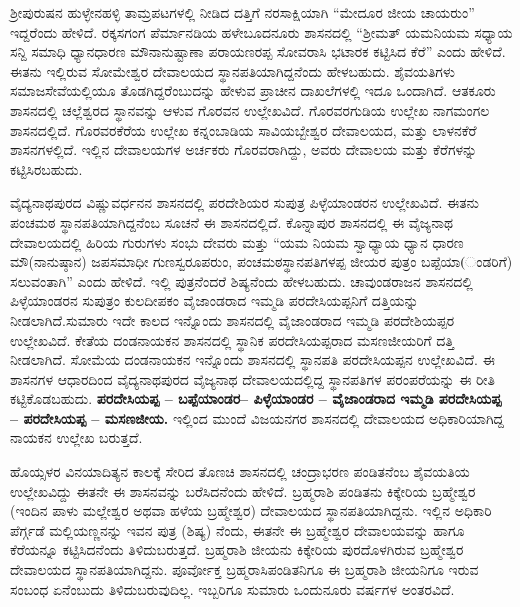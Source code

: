 ಶ‍್ರೀಪುರುಷನ ಹುಳ್ಳೇನಹಳ್ಳಿ ತಾಮ್ರಪಟಗಳಲ್ಲಿ ನೀಡಿದ ದತ್ತಿಗೆ ನರಸಾಕ್ಷಿಯಾಗಿ “ಮೇದೂರ ಜೀಯ ಚಾಯರುಂ” ಇದ್ದರೆಂದು ಹೇಳಿದೆ. ರಕ್ಕಸಗಂಗ ಪೆರ್ಮಾನಡಿಯ ಹಳೇಬೂದನೂರು ಶಾಸನದಲ್ಲಿ “ಶ‍್ರೀಮತ್​ ಯಮನಿಯಮ ಸಧ್ಯಾಯ ಸನ್ದಿ ಸಮಾಧಿ ಧ್ಯಾನಧಾರಣ ಮೌನಾನುಷ್ಟಾಣಾ ಪರಾಯಣರಪ್ಪ ಸೋವರಾಸಿ ಭಟಾರಕ ಕಟ್ಟಿಸಿದ ಕೆರೆ” ಎಂದು ಹೇಳಿದೆ. ಈತನು ಇಲ್ಲಿರುವ ಸೋಮೇಶ್ವರ ದೇವಾಲಯದ ಸ್ಥಾನಪತಿಯಾಗಿದ್ದನೆಂದು ಹೇಳಬಹುದು. ಶೈವಯತಿಗಳು ಸಮಾಜಸೇವೆಯಲ್ಲಿಯೂ ತೊಡಗಿದ್ದರೆಂಬುದನ್ನು ಹೇಳುವ ಪ್ರಾಚೀನ ದಾಖಲೆಗಳಲ್ಲಿ ಇದೂ ಒಂದಾಗಿದೆ. ಆತಕೂರು ಶಾಸನದಲ್ಲಿ ಚಲ್ಲೆಶ್ವರದ ಸ್ಥಾನವನ್ನು ಆಳುವ ಗೊರವನ ಉಲ್ಲೇಖವಿದೆ. ಗೊರವರಗುಡಿಯ ಉಲ್ಲೇಖ ನಾಗಮಂಗಲ ಶಾಸನದಲ್ಲಿದೆ. ಗೊರವರಕೆರೆಯ ಉಲ್ಲೇಖ ಕನ್ನಂಬಾಡಿಯ ಸಾವಿಯಬ್ಬೇಶ್ವರ ದೇವಾಲಯದ,  ಮತ್ತು ಲಾಳನಕೆರೆ ಶಾಸನಗಳಲ್ಲಿದೆ. ಇಲ್ಲಿನ ದೇವಾಲಯಗಳ ಅರ್ಚಕರು ಗೊರವರಾಗಿದ್ದು, ಅವರು ದೇವಾಲಯ ಮತ್ತು ಕೆರೆಗಳನ್ನು ಕಟ್ಟಿಸಿರಬಹುದು.

ವೈದ್ಯನಾಥಪುರದ ವಿಷ್ಣುವರ್ಧನನ ಶಾಸನದಲ್ಲಿ ಪರದೇಶಿಯರ ಸುಪುತ್ರ ಪಿಳ್ಳೆಯಾಂಡರನ ಉಲ್ಲೇಖವಿದೆ. ಈತನು ಪಂಚಮಠ ಸ್ಥಾನಪತಿಯಾಗಿದ್ದನೆಂಬ ಸೂಚನೆ ಈ ಶಾಸನದಲ್ಲಿದೆ. ಕೊನ್ನಾಪುರ ಶಾಸನದಲ್ಲಿ ಈ ವೈಜ್ಯನಾಥ ದೇವಾಲಯದಲ್ಲಿ ಹಿರಿಯ ಗುರುಗಳು ಸಂಭು ದೇವರು ಮತ್ತು “ಯಮ ನಿಯಮ ಸ್ವಾಧ್ಯಾಯ ಧ್ಯಾನ ಧಾರಣ ಮೌ(ನಾನುಷ್ಠಾನ) ಜಪಸಮಾಧೀ ಗುಣಸ್ವರೂಪರುಂ, ಪಂಚಮಠಸ್ಥಾನಪತಿಗಳಪ್ಪ ಜೀಯರ ಪುತ್ರಂ ಬಪ್ಪೆಯಾ(ಂಡರಿಗೆ) ಸಲುವಂತಾಗಿ” ಎಂದು ಹೇಳಿದೆ. ಇಲ್ಲಿ ಪುತ್ರನೆಂದರೆ ಶಿಷ್ಯನೆಂದು ಹೇಳಬಹುದು. ಚಾವುಂಡರಾಜನ ಶಾಸನದಲ್ಲಿ ಪಿಳ್ಳೆಯಾಂಡರನ ಸುಪುತ್ರಂ ಕುಲದೀಪಕಂ ವೈಜಾಂಡರಾದ ಇಮ್ಮಡಿ ಪರದೇಸಿಯಪ್ಪನಿಗೆ ದತ್ತಿಯನ್ನು ನೀಡಲಾಗಿದೆ.ಸುಮಾರು ಇದೇ ಕಾಲದ ಇನ್ನೊಂದು ಶಾಸನದಲ್ಲಿ ವೈಜಾಂಡರಾದ ಇಮ್ಮಡಿ ಪರದೇಶಿಯಪ್ಪರ ಉಲ್ಲೇಖವಿದೆ. ಕೇತೆಯ ದಂಡನಾಯಕನ ಶಾಸನದಲ್ಲಿ ಸ್ಥಾನಿಕ ಪರದೇಸಿಯಪ್ಪರಾದ ಮಸಣಜೀಯರಿಗೆ ದತ್ತಿ ನೀಡಲಾಗಿದೆ. ಸೋಮೆಯ ದಂಡನಾಯಕನ ಇನ್ನೊಂದು ಶಾಸನದಲ್ಲಿ ಸ್ಥಾನಪತಿ ಪರದೇಸಿಯಪ್ಪನ ಉಲ್ಲೇಖವಿದೆ. ಈ ಶಾಸನಗಳ ಆಧಾರದಿಂದ ವೈದ್ಯನಾಥಪುರದ ವೈಜ್ಯನಾಥ ದೇವಾಲಯದಲ್ಲಿದ್ದ ಸ್ಥಾನಪತಿಗಳ ಪರಂಪರೆಯನ್ನು ಈ ರೀತಿ ಕಟ್ಟಿಕೊಡಬಹುದು. \textbf{ಪರದೇಸಿಯಪ್ಪ – ಬಪ್ಪೆಯಾಂಡರ– ಪಿಳ್ಳೆಯಾಂಡರ – ವೈಜಾಂಡರಾದ ಇಮ್ಮಡಿ ಪರದೇಸಿಯಪ್ಪ – ಪರದೇಸಿಯಪ್ಪ – ಮಸಣಜೀಯ.} ಇಲ್ಲಿಂದ ಮುಂದೆ ವಿಜಯನಗರ ಶಾಸನದಲ್ಲಿ ದೇವಾಲಯದ ಅಧಿಕಾರಿಯಾಗಿದ್ದ ನಾಯಕನ ಉಲ್ಲೇಖ ಬರುತ್ತದೆ.

ಹೊಯ್ಸಳರ ವಿನಯಾದಿತ್ಯನ ಕಾಲಕ್ಕೆ ಸೇರಿದ ತೊಣಚಿ ಶಾಸನದಲ್ಲಿ ಚಂದ್ರಾಭರಣ ಪಂಡಿತನೆಂಬ ಶೈವಯತಿಯ ಉಲ್ಲೇಖವಿದ್ದು ಈತನೇ ಈ ಶಾಸನವನ್ನು ಬರೆಸಿದನೆಂದು ಹೇಳಿದೆ. ಬ್ರಹ್ಮರಾಶಿ ಪಂಡಿತನು ಕಿಕ್ಕೇರಿಯ ಬ್ರಹ್ಮೇಶ್ವರ (ಇಂದಿನ ಪಾಳು ಮಲ್ಲೇಶ್ವರ ಅಥವಾ ಹಳೆಯ ಬ್ರಹ್ಮೇಶ್ವರ) ದೇವಾಲಯದ ಸ್ಥಾನಪತಿಯಾಗಿದ್ದನು. ಇಲ್ಲಿನ ಅಧಿಕಾರಿ ಪೆರ್ಗ್ಗಡೆ ಮಲ್ಲಿಯಣ್ಣನನ್ನು ಇವನ ಪುತ್ರ (ಶಿಷ್ಯ) ನೆಂದು, ಈತನೇ ಈ ಬ್ರಹ್ಮೇಶ್ವರ ದೇವಾಲಯವನ್ನು ಹಾಗೂ ಕೆರೆಯನ್ನೂ ಕಟ್ಟಿಸಿದನೆಂದು ತಿಳಿದುಬರುತ್ತದೆ. ಬ್ರಹ್ಮರಾಶಿ ಜೀಯನು ಕಿಕ್ಕೇರಿಯ ಪುರದೊಳಗಿರುವ ಬ್ರಹ್ಮೇಶ್ವರ ದೇವಾಲಯದ ಸ್ಥಾನಪತಿಯಾಗಿದ್ದನು. ಪೂರ್ವೋಕ್ತ ಬ್ರಹ್ಮರಾಸಿಪಂಡಿತನಿಗೂ ಈ ಬ್ರಹ್ಮರಾಶಿ ಜೀಯನಿಗೂ ಇರುವ ಸಂಬಂಧ ಏನೆಂಬುದು ತಿಳಿದುಬರುವುದಿಲ್ಲ. ಇಬ್ಬರಿಗೂ ಸುಮಾರು ಒಂದುನೂರು ವರ್ಷಗಳ ಅಂತರವಿದೆ.

